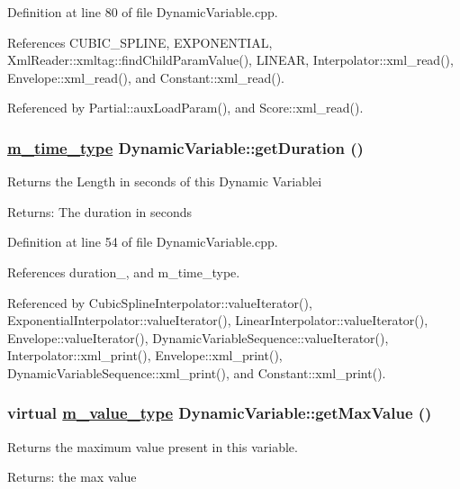 Definition at line 80 of file Dynamic\-Variable.cpp.

References CUBIC\_\-SPLINE, EXPONENTIAL, Xml\-Reader::xmltag::find\-Child\-Param\-Value(), LINEAR, Interpolator::xml\_\-read(), Envelope::xml\_\-read(), and Constant::xml\_\-read().

Referenced by Partial::aux\-Load\-Param(), and Score::xml\_\-read().\hypertarget{classDynamicVariable_a7}{
\subsubsection[getDuration]{\setlength{\rightskip}{0pt plus 5cm}\hyperlink{Types_8h_a2}{m\_\-time\_\-type} Dynamic\-Variable::get\-Duration ()}}
\label{classDynamicVariable_a7}


Returns the Length in seconds of this Dynamic Variablei \begin{Desc}
\item[Returns:]The duration in seconds \end{Desc}


Definition at line 54 of file Dynamic\-Variable.cpp.

References duration\_\-, and m\_\-time\_\-type.

Referenced by Cubic\-Spline\-Interpolator::value\-Iterator(), Exponential\-Interpolator::value\-Iterator(), Linear\-Interpolator::value\-Iterator(), Envelope::value\-Iterator(), Dynamic\-Variable\-Sequence::value\-Iterator(), Interpolator::xml\_\-print(), Envelope::xml\_\-print(), Dynamic\-Variable\-Sequence::xml\_\-print(), and Constant::xml\_\-print().\hypertarget{classDynamicVariable_a5}{
\subsubsection[getMaxValue]{\setlength{\rightskip}{0pt plus 5cm}virtual \hyperlink{Types_8h_a3}{m\_\-value\_\-type} Dynamic\-Variable::get\-Max\-Value ()}}
\label{classDynamicVariable_a5}


Returns the maximum value present in this variable. \begin{Desc}
\item[Returns:]the max value \end{Desc}


